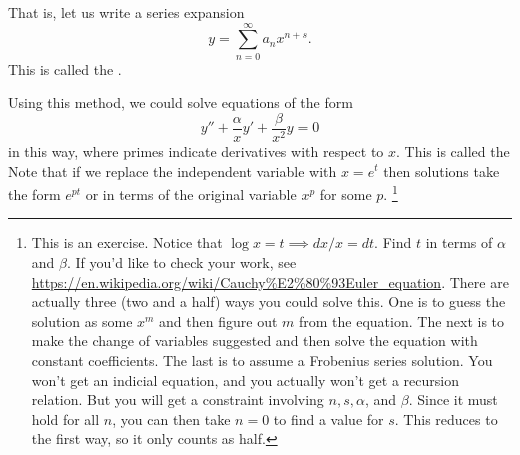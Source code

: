 That is, let us write a series expansion
\begin{equation}
    y = \sum_{n=0}^\infty a_n x^{n+s}.
\end{equation}
This is called the .

Using this method, we could solve equations of the form
\begin{equation}
    y'' + \frac{\alpha}{x} y' + \frac{\beta}{x^2}y=0
\end{equation}
in this way, where primes indicate derivatives with respect to $x$. This is called the  Note that if we replace the independent variable with $x = e^t$ then solutions take the form $e^{pt}$ or in terms of the original variable $x^p$ for some $p$.%
    \footnote{This is an exercise. Notice that $\log x = t \implies dx/x = dt$. Find $t$ in terms of $\alpha$ and $\beta$. If you'd like to check your work, see \url{https://en.wikipedia.org/wiki/Cauchy\%E2\%80\%93Euler_equation}. There are actually three (two and a half) ways you could solve this. One is to guess the solution as some $x^m$ and then figure out $m$ from the equation. The next is to make the change of variables suggested and then solve the equation with constant coefficients. The last is to assume a Frobenius series solution. You won't get an indicial equation, and you actually won't get a recursion relation. But you will get a constraint involving $n,s,\alpha$, and $\beta$. Since it must hold for all $n$, you can then take $n=0$ to find a value for $s$. This reduces to the first way, so it only counts as half.}

